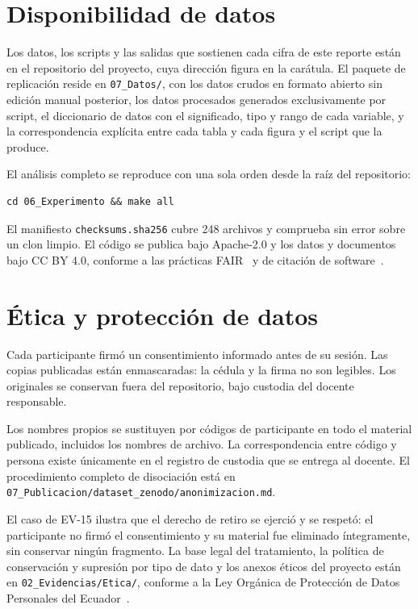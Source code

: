 \documentclass[11pt,a4paper]{article}
\begin{document}
\section{Disponibilidad de datos}

Los datos, los scripts y las salidas que sostienen cada cifra de este reporte est\'an en
el repositorio del proyecto, cuya direcci\'on figura en la car\'atula. El paquete de
replicaci\'on reside en \texttt{07\_Datos/}, con los datos crudos en formato abierto sin
edici\'on manual posterior, los datos procesados generados exclusivamente por script, el
diccionario de datos con el significado, tipo y rango de cada variable, y la
correspondencia expl\'icita entre cada tabla y cada figura y el script que la produce.

El an\'alisis completo se reproduce con una sola orden desde la ra\'iz del repositorio:

\begin{verbatim}
cd 06_Experimento && make all
\end{verbatim}

El manifiesto \texttt{checksums.sha256} cubre 248 archivos y comprueba sin error sobre
un clon limpio. El c\'odigo se publica bajo Apache-2.0 y los datos y documentos bajo CC
BY 4.0, conforme a las pr\'acticas FAIR~\cite{wilkinson2016fair} y de citaci\'on de
software~\cite{smith2016software,druskat2021citation}.

\section{\'Etica y protecci\'on de datos}

Cada participante firm\'o un consentimiento informado antes de su sesi\'on. Las copias
publicadas est\'an enmascaradas: la c\'edula y la firma no son legibles. Los originales se
conservan fuera del repositorio, bajo custodia del docente responsable.

Los nombres propios se sustituyen por c\'odigos de participante en todo el material
publicado, incluidos los nombres de archivo. La correspondencia entre c\'odigo y persona
existe \'unicamente en el registro de custodia que se entrega al docente. El
procedimiento completo de disociaci\'on est\'a en \texttt{07\_Publicacion/dataset\_zenodo/anonimizacion.md}.

El caso de EV-15 ilustra que el derecho de retiro se ejerci\'o y se respet\'o: el
participante no firm\'o el consentimiento y su material fue eliminado \'integramente, sin
conservar ning\'un fragmento. La base legal del tratamiento, la pol\'itica de
conservaci\'on y supresi\'on por tipo de dato y los anexos \'eticos del proyecto est\'an
en \texttt{02\_Evidencias/Etica/}, conforme a la Ley Org\'anica de Protecci\'on de Datos Personales
del Ecuador~\cite{asamblea2021lopdp}.
\end{document}
